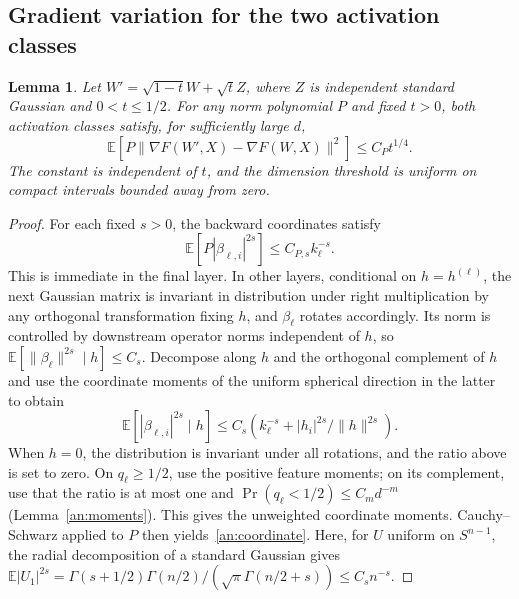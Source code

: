 \documentclass[a4paper]{tufte-handout}
\newtheorem{lemma}{Lemma}
\newcommand{\E}{\mathbb E}
\begin{document}
\begin{fullwidth}
\subsection{Gradient variation for the two activation classes}
\begin{lemma}\label{an:gradient-ou}
Let $W'=\sqrt{1-t}W+\sqrt tZ$, where $Z$ is independent standard Gaussian and $0<t\le1/2$.
For any norm polynomial $P$ and fixed $t>0$, both activation classes satisfy, for sufficiently large $d$,
\[
 \E[P\|\nabla F(W',X)-\nabla F(W,X)\|^2]
 \le C_Pt^{1/4}.
\]
The constant is independent of $t$, and the dimension threshold is uniform on compact intervals bounded away from zero.
\end{lemma}
\begin{proof}
For each fixed $s>0$, the backward coordinates satisfy
\begin{equation}\label{an:coordinate}
 \E[P|\beta_{\ell,i}|^{2s}]\le C_{P,s}k_\ell^{-s}.
\end{equation}
This is immediate in the final layer. In other layers, conditional on $h=h^{(\ell)}$, the next Gaussian matrix is invariant in distribution under right multiplication by any orthogonal transformation fixing $h$,
and $\beta_\ell$ rotates accordingly. Its norm is controlled by downstream operator norms independent of $h$,
so $\E[\|\beta_\ell\|^{2s}\mid h]\le C_s$.
Decompose along $h$ and the orthogonal complement of $h$ and use the coordinate moments of the uniform spherical direction in the latter to obtain
\[
 \E[|\beta_{\ell,i}|^{2s}\mid h]
 \le C_s\left(k_\ell^{-s}+|h_i|^{2s}/\|h\|^{2s}\right).
\]
When $h=0$, the distribution is invariant under all rotations, and the ratio above is set to zero.
On $q_\ell\ge1/2$, use the positive feature moments; on its complement, use that the ratio is at most one and
$\Pr(q_\ell<1/2)\le C_md^{-m}$ (Lemma~\ref{an:moments}).
This gives the unweighted coordinate moments. Cauchy--Schwarz applied to $P$ then yields~\eqref{an:coordinate}.
Here, for $U$ uniform on $S^{n-1}$, the radial decomposition of a standard Gaussian gives
$\E|U_1|^{2s}=\Gamma(s+1/2)\Gamma(n/2)/(\sqrt\pi\Gamma(n/2+s))\le C_sn^{-s}$.


\end{proof}
\end{fullwidth}
\end{document}

